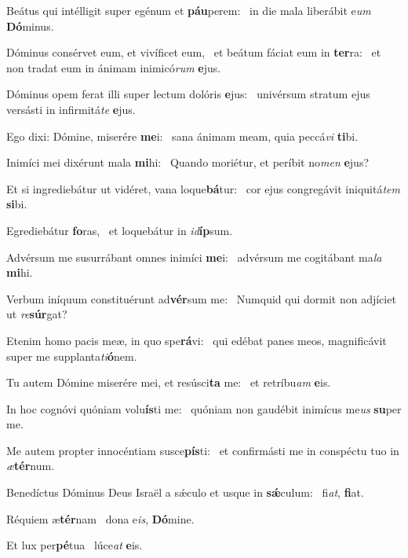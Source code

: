 \item Beátus qui intélligit super egénum et \textbf{páu}perem:~\psstar{} in die mala liberábit e\textit{um} \textbf{Dó}minus.
\item Dóminus consérvet eum, et vivíficet eum,~\pscross{} et beátum fáciat eum in \textbf{ter}ra:~\psstar{} et non tradat eum in ánimam inimicó\textit{rum} \textbf{e}jus.
\item Dóminus opem ferat illi super lectum dolóris \textbf{e}jus:~\psstar{} univérsum stratum ejus versásti in infirmitá\textit{te} \textbf{e}jus.
\item Ego dixi: Dómine, miserére \textbf{me}i:~\psstar{} sana ánimam meam, quia peccá\textit{vi} \textbf{ti}bi.
\item Inimíci mei dixérunt mala \textbf{mi}hi:~\psstar{} Quando moriétur, et períbit no\textit{men} \textbf{e}jus?
\item Et si ingrediebátur ut vidéret, vana loque\textbf{bá}tur:~\psstar{} cor ejus congregávit iniquitá\textit{tem} \textbf{si}bi.
\item Egrediebátur \textbf{fo}ras,~\psstar{} et loquebátur in \textit{id}\textbf{íp}sum.
\item Advérsum me susurrábant omnes inimíci \textbf{me}i:~\psstar{} advérsum me cogitábant ma\textit{la} \textbf{mi}hi.
\item Verbum iníquum constituérunt ad\textbf{vér}sum me:~\psstar{} Numquid qui dormit non adjíciet ut \textit{re}\textbf{súr}gat?
\item Etenim homo pacis meæ, in quo spe\textbf{rá}vi:~\psstar{} qui edébat panes meos, magnificávit super me supplanta\textit{ti}\textbf{ó}nem.
\item Tu autem Dómine miserére mei, et resúsci\textbf{ta} me:~\psstar{} et retríbu\textit{am} \textbf{e}is.
\item In hoc cognóvi quóniam volu\textbf{ís}ti me:~\psstar{} quóniam non gaudébit inimícus me\textit{us} \textbf{su}per me.
\item Me autem propter innocéntiam susce\textbf{pís}ti:~\psstar{} et confirmásti me in conspéctu tuo in \textit{æ}\textbf{tér}num.
\item Benedíctus Dóminus Deus Israël a sǽculo et usque in \textbf{sǽ}culum:~\psstar{} fi\textit{at}, \textbf{fi}at.
\item Réquiem æ\textbf{tér}nam~\psstar{} dona e\textit{is}, \textbf{Dó}mine.
\item Et lux per\textbf{pé}tua~\psstar{} lúce\textit{at} \textbf{e}is.
